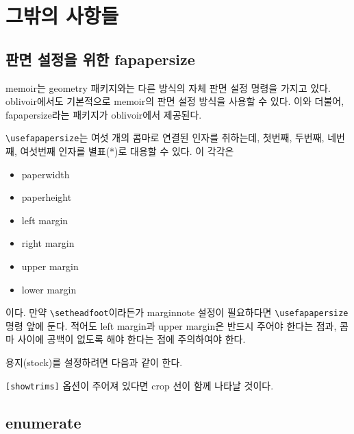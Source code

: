 \documentclass[
	12pt,
	a4paper,
	kosection,
	footnote,
	nobookmarks,
	microtype,
]{oblivoir}
\def\cs#1{\texttt{\textbackslash #1}}
\begin{document}
\section{그밖의 사항들}

\subsection{판면 설정을 위한 fapapersize}

memoir는 geometry 패키지와는 다른 방식의 자체 판면 설정 명령을 가지고 있다.
oblivoir에서도 기본적으로 memoir의 판면 설정 방식을 사용할 수 있다.
이와 더불어, \textsf{fapapersize}라는 패키지가
oblivoir에서 제공된다.

\begin{boxedverbatim}
\usepackage{fapapersize}
\usefapapersize{*,*,1in,*,1in,*}
\end{boxedverbatim}

\cs{usefapapersize}는 여섯 개의 콤마로 연결된 인자를 취하는데, 첫번째, 두번째, 네번째, 여섯번째 인자를 별표(*)로 대용할 수 있다. 이 각각은 
\begin{itemize}\tightlist
\item paperwidth
\item paperheight
\item left margin
\item right margin
\item upper margin
\item lower margin
\end{itemize}
이다. 만약 \cs{setheadfoot}이라든가 marginnote 설정이 필요하다면 \cs{usefapapersize} 명령 앞에 둔다.
적어도 left margin과 upper margin은 반드시 주어야 한다는 점과, 콤마 사이에 공백이 없도록 해야 한다는 점에 주의하여야 한다.

용지(stock)를 설정하려면 다음과 같이 한다.
\begin{boxedverbatim}
\usepackage[stock]{fapapersize}
\usefastocksize{210mm,297mm}
\usefapapersize{190mm,260mm,1in,*,1in,*}
\end{boxedverbatim}
\texttt{[showtrims]} 옵션이 주어져 있다면 crop 선이 함께 나타날 것이다.

\subsection{enumerate}
\end{document}
